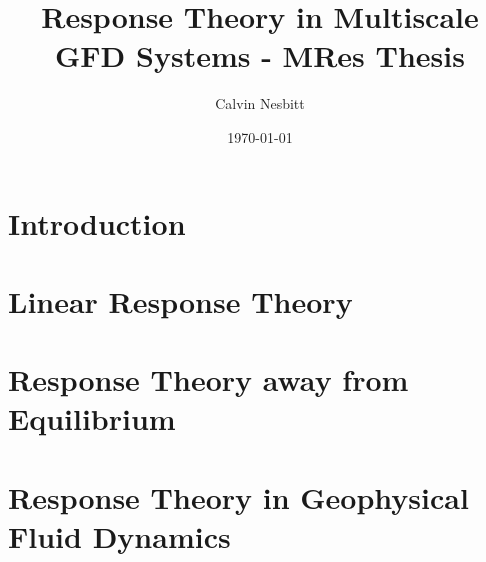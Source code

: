 \documentclass[11pt,letterpaper,oneside,openright]{report}
\title{Response Theory in Multiscale GFD Systems - MRes Thesis}
\date{\today}
\author{Calvin Nesbitt}
\begin{document}
\maketitle

\tableofcontents 

\cleardoublepage

\chapter{Introduction}

\chapter{Linear Response Theory} \label{Chapter:LRT}





\chapter{Response Theory away from Equilibrium}




\chapter{Response Theory in Geophysical Fluid Dynamics}



\clearpage 

\end{document}
